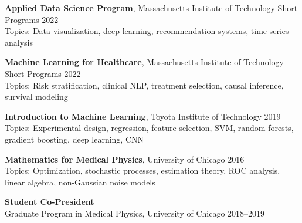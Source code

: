 \documentclass[10pt,letterpaper]{article}
\begin{document}
\begin{benumerate}{4}

\item
  \textbf{Applied Data Science Program}, Massachusetts Institute of Technology Short Programs \hfill 2022\\
  Topics: Data visualization, deep learning, recommendation systems, time series analysis
  
\item
  \textbf{Machine Learning for Healthcare}, Massachusetts Institute of Technology Short Programs \hfill 2022\\
  Topics: Risk stratification, clinical NLP, treatment selection, causal inference, survival modeling

\item  
  \textbf{Introduction to Machine Learning}, Toyota Institute of Technology \hfill 2019\\
  Topics: Experimental design, regression, feature selection, SVM, random forests, gradient boosting, deep learning, CNN

\item
  \textbf{Mathematics for Medical Physics}, University of Chicago \hfill 2016\\
  Topics: Optimization, stochastic processes, estimation theory, ROC analysis, linear algebra, non-Gaussian noise models

\end{benumerate}


\begin{benumerate}{1}
\item
  \textbf{Student Co-President}\\
  Graduate Program in Medical Physics, University of Chicago \hfill 2018--2019
\end{benumerate}
\end{document}
